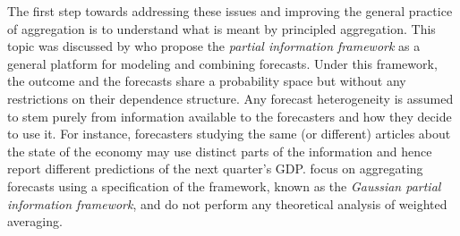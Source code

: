 \documentclass[11pt]{article}
\theoremstyle{definition}
\theoremstyle{definition}
\begin{document}

The first step towards addressing these issues and improving the general practice of aggregation  is to understand what is meant by principled aggregation. This topic was discussed by \cite{satopaamodeling2, satopaamodeling} who propose the \textit{partial information 
framework} as a general platform for modeling and combining forecasts. Under this framework, the outcome and the forecasts share a probability space but without any restrictions on their dependence structure. Any forecast heterogeneity  is assumed to stem purely from information available to the forecasters and how they decide to use it. For instance, forecasters studying the same (or different) articles about the state of the economy may use distinct parts of the information and hence report different predictions of the next quarter's GDP. 
%
\cite{satopaamodeling2, satopaamodeling} focus on aggregating forecasts using a  specification of the framework, known as the \textit{Gaussian partial information framework}, and do not perform 
 any theoretical analysis of weighted averaging. 
\end{document}
